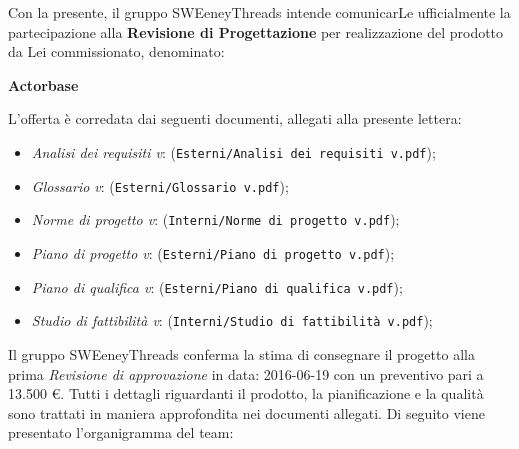 \documentclass[a4paper]{article}
\begin{document}
	\vspace{5mm}Con la presente, il gruppo SWEeneyThreads intende comunicarLe ufficialmente la partecipazione alla {\textbf{Revisione di Progettazione}} per realizzazione del prodotto da Lei commissionato, denominato: \newline \newline
	\centerline{\textbf{Actorbase}}
	\newline \newline
	L'offerta è corredata dai seguenti documenti, allegati alla presente lettera:
	\begin{itemize}
		\item \emph{Analisi dei requisiti v}: (\verb|Esterni/Analisi dei requisiti v.pdf|);
		\item \emph{Glossario v}: (\verb|Esterni/Glossario v.pdf|);
		\item \emph{Norme di progetto v}: (\verb|Interni/Norme di progetto v.pdf|);
		\item \emph{Piano di progetto v}: (\verb|Esterni/Piano di progetto v.pdf|);
		\item \emph{Piano di qualifica v}: (\verb|Esterni/Piano di qualifica v.pdf|);
		\item \emph{Studio di fattibilità v}: (\verb|Interni/Studio di fattibilità v.pdf|);
	\end{itemize}
	Il gruppo SWEeneyThreads conferma la stima di consegnare il progetto alla prima \emph{Revisione di approvazione}
	in data: 2016-06-19 con un preventivo pari a 13.500 \euro .
	Tutti i dettagli riguardanti il prodotto, la pianificazione e la qualità sono trattati in maniera approfondita 
	nei documenti allegati.
	\newline\newline
	Di seguito viene presentato l’organigramma del team:
	
\end{document}
